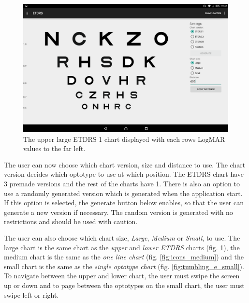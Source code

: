 \documentclass[12pt,a4paper,notitlepage]{report}
\begin{document}
\begin{figure}[ht!]
\centering
\includegraphics[width=120mm]{images/appgui/etdrs_large.png}
\caption{The upper large ETDRS 1 chart displayed with each rows LogMAR values to the far left.}
\label{fig:etdrs_large}
\end{figure}

The user can now choose which chart version, size and distance to use. The chart version decides which optotype to use at which position. The ETDRS chart have 3 premade versions\cite{Ferris} and the rest of the charts have 1. There is also an option to use a randomly generated version which is generated when the application start. If this option is selected, the generate button below enables, so that the user can generate a new version if necessary. The random version is generated with no restrictions and should be used with caution.

The user can also choose which chart size, \textit{Large}, \textit{Medium} or \textit{Small}, to use. The large chart is the same chart as the \textit{upper} and \textit{lower ETDRS} charts (fig. \ref{fig:etdrs_large}), the medium chart is the same as the \textit{one line chart} (fig. \ref{fig:icons_medium}) and the small chart is the same as the \textit{single optotype chart} (fig. \ref{fig:tumbling_e_small}). To navigate between the upper and lower chart, the user must swipe the screen up or down and to page between the optotypes on the small chart, the user must swipe left or right.
\end{document}
